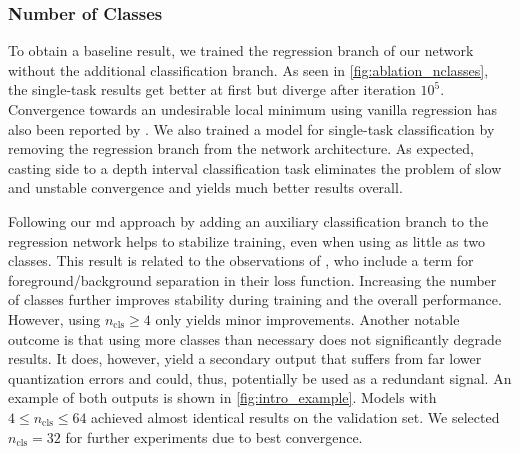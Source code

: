 \documentclass[lang=english]{tumarxivarticle}
\newcommand{\citet}{\textcite}
\begin{document}
\subsubsection{Number of Classes}
\label{subsec:ablation_nclasses}

To obtain a baseline result, we trained the regression branch of our network without the additional classification branch.
As seen in \cref{fig:ablation_nclasses}, the single-task results get better at first but diverge after iteration $10^5$.
Convergence towards an undesirable local minimum using vanilla regression has also been reported by \citet{Fu18}.
We also trained a model for single-task classification by removing the regression branch from the network architecture.
As expected, casting \gls{side} to a depth interval classification task eliminates the problem of slow and unstable convergence and yields much better results overall.

Following our \gls{md} approach by adding an auxiliary classification branch to the regression network helps to stabilize training, even when using as little as two classes.
This result is related to the observations of \citet{Li18}, who include a term for foreground/background separation in their loss function.
Increasing the number of classes further improves stability during training and the overall performance.
However, using $n_\text{cls} \geq 4$ only yields minor improvements.
Another notable outcome is that using more classes than necessary does not significantly degrade results.
It does, however, yield a secondary output that suffers from far lower quantization errors and could, thus, potentially be used as a redundant signal.
An example of both outputs is shown in \cref{fig:intro_example}.
Models with $4 \leq n_\text{cls} \leq 64$ achieved almost identical results on the validation set.
We selected $n_\text{cls} = 32$ for further experiments due to best convergence.
\end{document}
